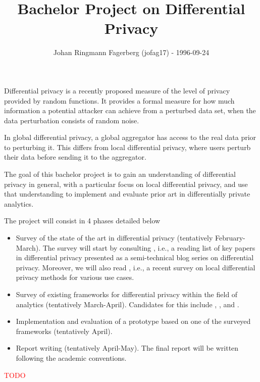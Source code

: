 \documentclass[a4paper]{article}
\title{\vspace{-2cm}Bachelor Project on Differential Privacy}
\author{Johan Ringmann Fagerberg (jofag17) - 1996-09-24}
\date{}
\begin{document}
\maketitle

\begin{description}[style=nextline]
    \item[Motivation] Differential privacy is a recently proposed measure of the level of privacy provided by random functions. It provides a formal measure for how much information a potential attacker can achieve from a perturbed data set, when the data perturbation consists of random noise.
    
    In global differential privacy, a global aggregator has access to the real data prior to perturbing it. This differs from local differential privacy, where users perturb their data before sending it to the aggregator.
    
    The goal of this bachelor project is to gain an understanding of 
differential privacy in general, with a particular focus on local differential 
privacy, and use that understanding to implement and evaluate prior art in differentially private analytics.

\item[Plan]
    The project will consist in 4 phases detailed below
    \begin{itemize}
     \item Survey of the state of the art in differential privacy (tentatively February-March). 
The survey will start by consulting \cite{desfontain_overview}, i.e., a reading 
list of key papers in differential privacy presented as a semi-technical blog 
series on differential privacy. Moreover, we will also read 
\cite{localdiffpriv_survey}, i.e., a recent survey on local differential privacy 
methods for various use cases.
     \item Survey of existing frameworks for differential privacy within the field of analytics (tentatively March-April).
Candidates for this include \cite{rappor}, \cite{prochlo}, \cite{multidimensional_localdiff} and \cite{microsoft_telemetry}.
     \item Implementation and evaluation of a prototype based on one of the surveyed frameworks (tentatively April).
     \item Report writing (tentatively April-May). The final report will be written 
following the academic conventions.
    \end{itemize}
    
\item[Risks] \textcolor{red}{TODO}


\end{description}
\end{document}
